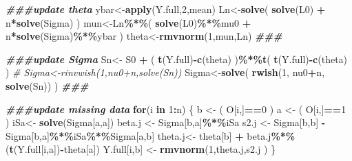 \documentclass[12pt]{article}
\newenvironment{Shaded}{\begin{snugshade}}{\end{snugshade}}
\newcommand{\CommentTok}[1]{\textcolor[rgb]{0.56,0.35,0.01}{\textit{#1}}}
\newcommand{\ControlFlowTok}[1]{\textcolor[rgb]{0.13,0.29,0.53}{\textbf{#1}}}
\newcommand{\DecValTok}[1]{\textcolor[rgb]{0.00,0.00,0.81}{#1}}
\newcommand{\DocumentationTok}[1]{\textcolor[rgb]{0.56,0.35,0.01}{\textbf{\textit{#1}}}}
\newcommand{\FunctionTok}[1]{\textcolor[rgb]{0.13,0.29,0.53}{\textbf{#1}}}
\newcommand{\NormalTok}[1]{#1}
\newcommand{\OtherTok}[1]{\textcolor[rgb]{0.56,0.35,0.01}{#1}}
\newcommand{\SpecialCharTok}[1]{\textcolor[rgb]{0.81,0.36,0.00}{\textbf{#1}}}
\begin{document}
\begin{Shaded}
\begin{Highlighting}[]
  \DocumentationTok{\#\#\#update theta}
\NormalTok{  ybar}\OtherTok{\textless{}{-}}\FunctionTok{apply}\NormalTok{(Y.full,}\DecValTok{2}\NormalTok{,mean)}
\NormalTok{  Ln}\OtherTok{\textless{}{-}}\FunctionTok{solve}\NormalTok{( }\FunctionTok{solve}\NormalTok{(L0) }\SpecialCharTok{+}\NormalTok{ n}\SpecialCharTok{*}\FunctionTok{solve}\NormalTok{(Sigma) )}
\NormalTok{  mun}\OtherTok{\textless{}{-}}\NormalTok{Ln}\SpecialCharTok{\%*\%}\NormalTok{( }\FunctionTok{solve}\NormalTok{(L0)}\SpecialCharTok{\%*\%}\NormalTok{mu0 }\SpecialCharTok{+}\NormalTok{ n}\SpecialCharTok{*}\FunctionTok{solve}\NormalTok{(Sigma)}\SpecialCharTok{\%*\%}\NormalTok{ybar )}
\NormalTok{  theta}\OtherTok{\textless{}{-}}\FunctionTok{rmvnorm}\NormalTok{(}\DecValTok{1}\NormalTok{,mun,Ln)}
  \DocumentationTok{\#\#\#}
  
  \DocumentationTok{\#\#\#update Sigma}
\NormalTok{  Sn}\OtherTok{\textless{}{-}}\NormalTok{ S0 }\SpecialCharTok{+}\NormalTok{ ( }\FunctionTok{t}\NormalTok{(Y.full)}\SpecialCharTok{{-}}\FunctionTok{c}\NormalTok{(theta) )}\SpecialCharTok{\%*\%}\FunctionTok{t}\NormalTok{( }\FunctionTok{t}\NormalTok{(Y.full)}\SpecialCharTok{{-}}\FunctionTok{c}\NormalTok{(theta) )}
\CommentTok{\#  Sigma\textless{}{-}rinvwish(1,nu0+n,solve(Sn))}
\NormalTok{  Sigma}\OtherTok{\textless{}{-}}\FunctionTok{solve}\NormalTok{( }\FunctionTok{rwish}\NormalTok{(}\DecValTok{1}\NormalTok{, nu0}\SpecialCharTok{+}\NormalTok{n, }\FunctionTok{solve}\NormalTok{(Sn)) )}
  \DocumentationTok{\#\#\#}
  
  \DocumentationTok{\#\#\#update missing data}
  \ControlFlowTok{for}\NormalTok{(i }\ControlFlowTok{in} \DecValTok{1}\SpecialCharTok{:}\NormalTok{n)}
\NormalTok{  \{ }
\NormalTok{    b }\OtherTok{\textless{}{-}}\NormalTok{ ( O[i,]}\SpecialCharTok{==}\DecValTok{0}\NormalTok{ )}
\NormalTok{    a }\OtherTok{\textless{}{-}}\NormalTok{ ( O[i,]}\SpecialCharTok{==}\DecValTok{1}\NormalTok{ )}
\NormalTok{    iSa}\OtherTok{\textless{}{-}} \FunctionTok{solve}\NormalTok{(Sigma[a,a])}
\NormalTok{    beta.j }\OtherTok{\textless{}{-}}\NormalTok{ Sigma[b,a]}\SpecialCharTok{\%*\%}\NormalTok{iSa}
\NormalTok{    s2.j   }\OtherTok{\textless{}{-}}\NormalTok{ Sigma[b,b] }\SpecialCharTok{{-}}\NormalTok{ Sigma[b,a]}\SpecialCharTok{\%*\%}\NormalTok{iSa}\SpecialCharTok{\%*\%}\NormalTok{Sigma[a,b]}
\NormalTok{    theta.j}\OtherTok{\textless{}{-}}\NormalTok{ theta[b] }\SpecialCharTok{+}\NormalTok{ beta.j}\SpecialCharTok{\%*\%}\NormalTok{(}\FunctionTok{t}\NormalTok{(Y.full[i,a])}\SpecialCharTok{{-}}\NormalTok{theta[a])}
\NormalTok{    Y.full[i,b] }\OtherTok{\textless{}{-}} \FunctionTok{rmvnorm}\NormalTok{(}\DecValTok{1}\NormalTok{,theta.j,s2.j )}
\NormalTok{  \}}
  

\end{Highlighting}
\end{Shaded}
\end{document}
